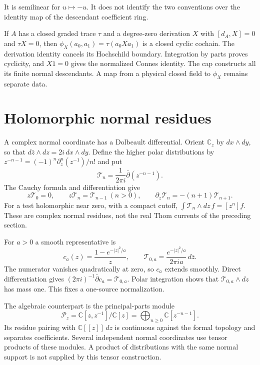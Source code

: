 It is semilinear for $u\mapsto-u$.
It does not identify the two conventions over the identity
map of the descendant coefficient ring.

If $A$ has a closed graded trace $\tau$ and a degree-zero
derivation $X$ with $[d_A,X]=0$ and $\tau X=0$, then
$\phi_X(a_0,a_1)=\tau(a_0Xa_1)$ is a closed cyclic cochain.
The derivation identity cancels its Hochschild boundary.
Integration by parts proves cyclicity, and $X1=0$ gives
the normalized Connes identity. The cap constructs all its
finite normal descendants. A map from a physical closed
field to $\phi_X$ remains separate data.

\section{Holomorphic normal residues}

A complex normal coordinate has a Dolbeault differential.
Orient $\mathbb C_z$ by $dx\wedge dy$, so that
$d\bar z\wedge dz=2i\,dx\wedge dy$.
Define the higher polar distributions by
$z^{-n-1}=(-1)^n\partial_z^n(z^{-1})/n!$ and put
\[
 \mathcal T_n=\frac1{2\pi i}\bar\partial(z^{-n-1}).
\]
The Cauchy formula and differentiation give
\begin{equation}\label{mht:eq:holomorphic-normal-actions}
 z\mathcal T_0=0,\qquad z\mathcal T_n=\mathcal T_{n-1}\ (n>0),
 \qquad \partial_z\mathcal T_n=-(n+1)\mathcal T_{n+1}.
\end{equation}
For a test holomorphic near zero, with a compact cutoff,
$\int\mathcal T_n\wedge dz\,f=[z^n]f$.
These are complex normal residues, not the real Thom
currents of the preceding section.

For $a>0$ a smooth representative is
\[
 c_a(z)=\frac{1-e^{-|z|^2/a}}z,\qquad
 \mathcal T_{0,a}=\frac{e^{-|z|^2/a}}{2\pi i a}\,d\bar z.
\]
The numerator vanishes quadratically at zero, so $c_a$
extends smoothly. Direct differentiation gives
$(2\pi i)^{-1}\bar\partial c_a=\mathcal T_{0,a}$.
Polar integration shows that $\mathcal T_{0,a}\wedge dz$
has mass one. This fixes a one-source normalization.

The algebraic counterpart is the principal-parts module
\[
 \mathcal P_z=\mathbb C[z,z^{-1}]/\mathbb C[z]
       =\bigoplus_{n\geq0}\mathbb C[z^{-n-1}].
\]
Its residue pairing with $\mathbb C[[z]]\,dz$ is continuous
against the formal topology and separates coefficients.
Several independent normal coordinates use tensor products
of these modules. A product of distributions with the same
normal support is not supplied by this tensor construction.

